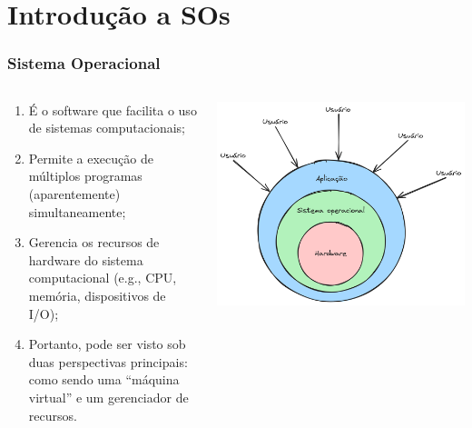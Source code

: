 \documentclass{beamer}
\begin{document}
\section{Introdução a SOs}

\begin{frame}[fragile]
    \frametitle{Sistema Operacional}

    \begin{columns}
        \begin{column}{0.4\textwidth}
            \begin{enumerate}\footnotesize
                \item É o software que facilita o uso de sistemas computacionais;
                \item Permite a execução de múltiplos programas (aparentemente) simultaneamente;
                \item Gerencia os recursos de hardware do sistema computacional (e.g., CPU, memória, dispositivos de I/O);
                \item Portanto, pode ser visto sob duas perspectivas principais: como sendo uma ``máquina virtual'' e um gerenciador de recursos.
            \end{enumerate}
        \end{column}
        
        \begin{column}{0.6\textwidth}
            \begin{center}
                \includegraphics[width=\textwidth]{../figures/basic_os.png}
            \end{center}
        \end{column}
    \end{columns}
\end{frame}
\end{document}
